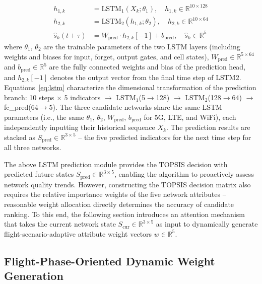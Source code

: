 \documentclass[journal,article,submit,moreauthors]{Definitions/mdpi}
\begin{document}
\begin{equation}
\begin{aligned}
h_{1,k} &= \text{LSTM}_1(X_k; \theta_1), \quad h_{1,k} \in \mathbb{R}^{10 \times 128} \\
h_{2,k} &= \text{LSTM}_2(h_{1,k}; \theta_2), \quad h_{2,k} \in \mathbb{R}^{10 \times 64} \\
\hat{s}_k(t+\tau) &= W_{\text{pred}} \cdot h_{2,k}[-1] + b_{\text{pred}}, \quad \hat{s}_k \in \mathbb{R}^5
\end{aligned}
\label{eq:lstm}
\end{equation}
where $\theta_1$, $\theta_2$ are the trainable parameters of the two LSTM layers (including weights and biases for input, forget, output gates, and cell states), $W_{\text{pred}} \in \mathbb{R}^{5 \times 64}$ and $b_{\text{pred}} \in \mathbb{R}^5$ are the fully connected weights and bias of the prediction head, and $h_{2,k}[-1]$ denotes the output vector from the final time step of LSTM2. Equations~\eqref{eq:lstm} characterize the dimensional transformation of the prediction branch: 10 steps $\times$ 5 indicators $\rightarrow$ LSTM$_1$(5$\rightarrow$128) $\rightarrow$ LSTM$_2$(128$\rightarrow$64) $\rightarrow$ fc\_pred(64$\rightarrow$5). The three candidate networks share the same LSTM parameters (i.e., the same $\theta_1$, $\theta_2$, $W_{\text{pred}}$, $b_{\text{pred}}$ for 5G, LTE, and WiFi), each independently inputting their historical sequence $X_k$. The prediction results are stacked as $S_{\text{pred}} \in \mathbb{R}^{3 \times 5}$ -- the five predicted indicators for the next time step for all three networks.

The above LSTM prediction module provides the TOPSIS decision with predicted future states $S_{\text{pred}} \in \mathbb{R}^{3 \times 5}$, enabling the algorithm to proactively assess network quality trends. However, constructing the TOPSIS decision matrix also requires the relative importance weights of the five network attributes -- reasonable weight allocation directly determines the accuracy of candidate ranking. To this end, the following section introduces an attention mechanism that takes the current network state $S_{\text{cur}} \in \mathbb{R}^{3 \times 5}$ as input to dynamically generate flight-scenario-adaptive attribute weight vectors $w \in \mathbb{R}^5$.

\subsection{Flight-Phase-Oriented Dynamic Weight Generation}
\label{sec:attention}
\end{document}
